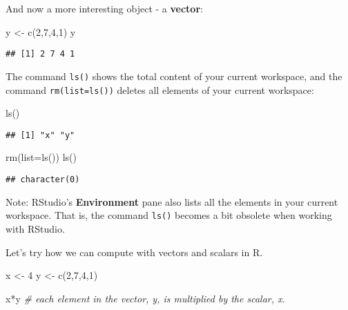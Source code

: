 \documentclass[
]{book}
\newenvironment{Shaded}{\begin{snugshade}}{\end{snugshade}}
\newcommand{\AttributeTok}[1]{\textcolor[rgb]{0.77,0.63,0.00}{#1}}
\newcommand{\CommentTok}[1]{\textcolor[rgb]{0.56,0.35,0.01}{\textit{#1}}}
\newcommand{\DecValTok}[1]{\textcolor[rgb]{0.00,0.00,0.81}{#1}}
\newcommand{\FunctionTok}[1]{\textcolor[rgb]{0.00,0.00,0.00}{#1}}
\newcommand{\NormalTok}[1]{#1}
\newcommand{\OtherTok}[1]{\textcolor[rgb]{0.56,0.35,0.01}{#1}}
\newcommand{\SpecialCharTok}[1]{\textcolor[rgb]{0.00,0.00,0.00}{#1}}
\begin{document}
And now a more interesting object - a \textbf{vector}:

\begin{Shaded}
\begin{Highlighting}[]
\NormalTok{y }\OtherTok{\textless{}{-}} \FunctionTok{c}\NormalTok{(}\DecValTok{2}\NormalTok{,}\DecValTok{7}\NormalTok{,}\DecValTok{4}\NormalTok{,}\DecValTok{1}\NormalTok{)}
\NormalTok{y}
\end{Highlighting}
\end{Shaded}

\begin{verbatim}
## [1] 2 7 4 1
\end{verbatim}

The command \texttt{ls()} shows the total content of your current workspace, and the command \texttt{rm(list=ls())} deletes all elements of your current workspace:

\begin{Shaded}
\begin{Highlighting}[]
\FunctionTok{ls}\NormalTok{()}
\end{Highlighting}
\end{Shaded}

\begin{verbatim}
## [1] "x" "y"
\end{verbatim}

\begin{Shaded}
\begin{Highlighting}[]
\FunctionTok{rm}\NormalTok{(}\AttributeTok{list=}\FunctionTok{ls}\NormalTok{())}
\FunctionTok{ls}\NormalTok{()}
\end{Highlighting}
\end{Shaded}

\begin{verbatim}
## character(0)
\end{verbatim}

Note: RStudio's \textbf{Environment} pane also lists all the elements in your current workspace. That is, the command \texttt{ls()} becomes a bit obsolete when working with RStudio.

Let's try how we can compute with vectors and scalars in R.

\begin{Shaded}
\begin{Highlighting}[]
\NormalTok{x }\OtherTok{\textless{}{-}} \DecValTok{4}
\NormalTok{y }\OtherTok{\textless{}{-}} \FunctionTok{c}\NormalTok{(}\DecValTok{2}\NormalTok{,}\DecValTok{7}\NormalTok{,}\DecValTok{4}\NormalTok{,}\DecValTok{1}\NormalTok{)}

\NormalTok{x}\SpecialCharTok{*}\NormalTok{y }\CommentTok{\# each element in the vector, y, is multiplied by the scalar, x.}
\end{Highlighting}
\end{Shaded}
\end{document}
